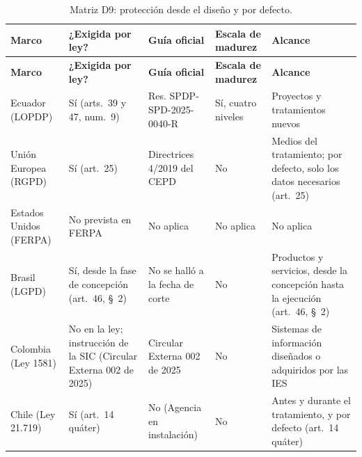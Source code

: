 {\scriptsize
\renewcommand{\arraystretch}{1.12}
\begin{xltabular}{\textwidth}{|>{\raggedright\arraybackslash}p{2.0cm}|L|L|L|L|}
  \caption{Matriz D9: protección desde el diseño y por defecto.}
  \label{tab:matriz_d9} \\
  \hline
  \textbf{Marco} & \textbf{¿Exigida por ley?} & \textbf{Guía oficial} & \textbf{Escala de madurez} & \textbf{Alcance} \\
  \hline
  \endfirsthead
  \hline
  \textbf{Marco} & \textbf{¿Exigida por ley?} & \textbf{Guía oficial} & \textbf{Escala de madurez} & \textbf{Alcance} \\
  \hline
  \endhead
  \hline
  \endlastfoot
  Ecuador (LOPDP) & Sí (arts.~39 y 47, num.~9) & Res. SPDP-SPD-2025-0040-R \cite{spdp2025diseno} & Sí, cuatro niveles \cite{avl2025diseno,tzvs2025diseno} & Proyectos y tratamientos nuevos \\ \hline
  Unión Europea (RGPD) & Sí (art.~25) \cite{rgpd2016} & Directrices 4/2019 del CEPD \cite{edpb2020art25} & No & Medios del tratamiento; por defecto, solo los datos necesarios (art.~25) \\ \hline
  Estados Unidos (FERPA) & No prevista en FERPA & No aplica & No aplica & No aplica \\ \hline
  Brasil (LGPD) & Sí, desde la fase de concepción (art.~46, §~2) & No se halló a la fecha de corte & No & Productos y servicios, desde la concepción hasta la ejecución (art.~46, §~2) \\ \hline
  Colombia (Ley 1581) & No en la ley; instrucción de la SIC (Circular Externa 002 de 2025) \cite{sic2026universitario} & Circular Externa 002 de 2025 & No & Sistemas de información diseñados o adquiridos por las IES \cite{sic2026universitario} \\ \hline
  Chile (Ley 21.719) & Sí (art.~14 quáter) & No (Agencia en instalación) & No & Antes y durante el tratamiento, y por defecto (art.~14 quáter) \\ \hline
\end{xltabular}
}

